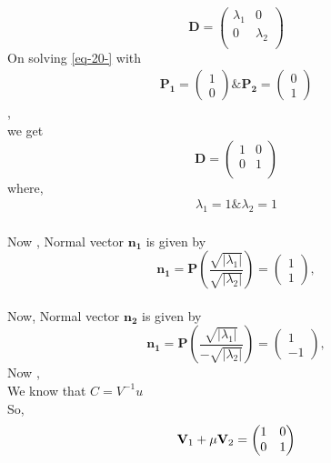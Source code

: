 \documentclass[journal,12pt,twocolumn]{IEEEtran}
\newcommand{\myvec}[1]{\ensuremath{\begin{pmatrix}#1\end{pmatrix}}}
\let\vec\mathbf
\let\vec\mathbf
\begin{document}
\begin{equation}
 \vec{D} = \begin{pmatrix}
          \lambda_1 & 0 \\
          0 & \lambda_2 \\
          \end{pmatrix}
  \end{equation}
  On solving \eqref{eq-20-} with 
  \begin{align} \vec{P_1} = \myvec{1 \\ 0} \&   \vec{P_2} = \myvec{0 \\ 1}
  \end{align},\\ we get
  \begin{equation}
 \vec{D} = \begin{pmatrix}
         1 & 0 \\                                                                              0 & 1 \\                                                                              
 \end{pmatrix}                                                                      
\end{equation}
where,
  \begin{align}
    \lambda_1 = 1  \&  \lambda_2 = 1
  \end{align}
\\
Now ,
 Normal vector  $\vec{n_1}$ is given by                                              \begin{equation}                                                                    
\vec{n_1} = \vec{P}(\frac{\sqrt{|\lambda_1|}}{\sqrt{|\lambda_2|}} ) = \myvec{1 \\1},
\end{equation}
\\
Now,
 Normal vector  $\vec{n_2}$ is given by                                              \begin{equation}                                                                    
\vec{n_1} = \vec{P}(\frac{\sqrt{|\lambda_1|}}{ - \sqrt{|\lambda_2|}} ) = \myvec{1 \\-1},
\end{equation}
Now ,\\
We know that $C = V^{-1} u $\\
So, 
\begin{align}
\vec{V}_1+\mu\vec{V}_2= \myvec{
1 & 0\\
0 & \-1
}
\end{align}
\end{document}
